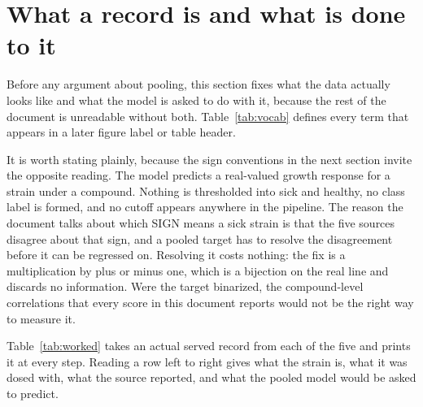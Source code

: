 
\section{What a record is and what is done to it}
\label{sec:record}

Before any argument about pooling, this section fixes what the data actually looks like and
what the model is asked to do with it, because the rest of the document is unreadable without
both. Table~\ref{tab:vocab} defines every term that appears in a later figure label or table
header.

\begin{table}[htbp]
\centering
\footnotesize
\caption{Controlled vocabulary, alphabetical. Each term is used in a figure label or a table
header later in the document.}
\label{tab:vocab}

\end{table}

It is worth stating plainly, because the sign conventions in the next section invite the
opposite reading. The model predicts a real-valued growth response for a strain under a
compound. Nothing is thresholded into sick and healthy, no class label is formed, and no
cutoff appears anywhere in the pipeline. The reason the document talks about which SIGN means
a sick strain is that the five sources disagree about that sign, and a pooled target has to
resolve the disagreement before it can be regressed on. Resolving it costs nothing: the fix
is a multiplication by plus or minus one, which is a bijection on the real line and discards
no information. Were the target binarized, the compound-level correlations that every score
in this document reports would not be the right way to measure it.

Table~\ref{tab:worked} takes an actual served record from each of the five and prints it at
every step. Reading a row left to right gives what the strain is, what it was dosed with,
what the source reported, and what the pooled model would be asked to predict.

